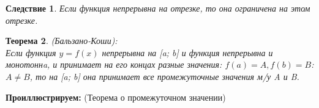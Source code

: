 \documentclass[12pt, a4paper]{article}
\newtheorem{theorem}{Теорема}[subsection]
\newtheorem{corollary}[theorem]{Следствие}
\theoremstyle{remark}
\begin{document}
\begin{center}
	\end{center}
	
	\begin{corollary}
		Если функция непрерывна на отрезке, то она ограничена на этом отрезке.
	\end{corollary}
	
	\begin{theorem}
		(Бальзано-Коши): \\
		
		Если функция $y = f(x)$ непрерывна на [a; b] и функция непрерывна и монотоннa, и принимает на его концах разные значения: $f(a) = A, f(b) = B$: $A \neq B$, то на [a; b] она принимает все промежуточные значения м/у A и B.
	\end{theorem}
	
	\newpage
	
	\noindent \textbf{Проиллюстрируем:} (Теорема о промежуточном значении)
	
	\vspace{0.3cm}
	
\end{document}
